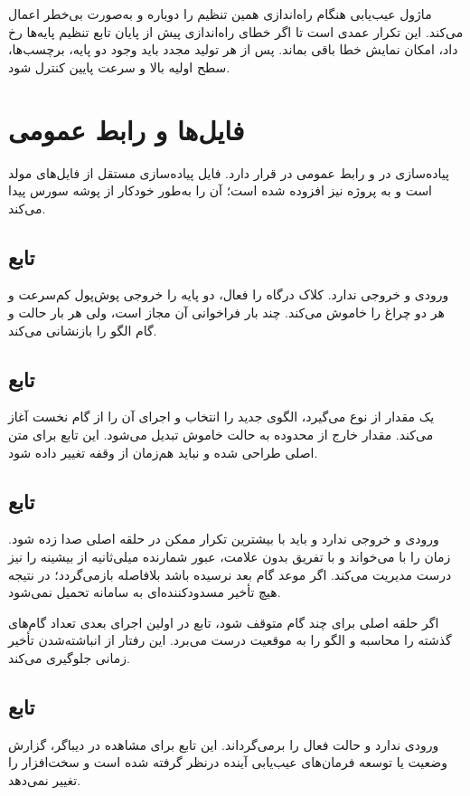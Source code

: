 ماژول عیب‌یابی هنگام راه‌اندازی همین تنظیم را دوباره و به‌صورت بی‌خطر اعمال می‌کند. این تکرار عمدی است تا اگر خطای راه‌اندازی پیش از پایان تابع تنظیم پایه‌ها رخ داد، امکان نمایش خطا باقی بماند. پس از هر تولید مجدد باید وجود دو پایه، برچسب‌ها، سطح اولیه بالا و سرعت پایین کنترل شود.

\section{فایل‌ها و رابط عمومی}
پیاده‌سازی در
و رابط عمومی در
قرار دارد. فایل پیاده‌سازی مستقل از فایل‌های مولد است و به پروژه
نیز افزوده شده است؛
آن را به‌طور خودکار از پوشه سورس پیدا می‌کند.

\subsection{تابع }
ورودی و خروجی ندارد. کلاک درگاه
را فعال، دو پایه را خروجی پوش‌پول کم‌سرعت و هر دو چراغ را خاموش می‌کند. چند بار فراخوانی آن مجاز است، ولی هر بار حالت و گام الگو را بازنشانی می‌کند.

\subsection{تابع }
یک مقدار از نوع
می‌گیرد، الگوی جدید را انتخاب و اجرای آن را از گام نخست آغاز می‌کند. مقدار خارج از محدوده به حالت خاموش تبدیل می‌شود. این تابع برای متن اصلی طراحی شده و نباید هم‌زمان از وقفه تغییر داده شود.

\subsection{تابع }
ورودی و خروجی ندارد و باید با بیشترین تکرار ممکن در حلقه اصلی صدا زده شود. زمان را با
می‌خواند و با تفریق بدون علامت، عبور شمارنده میلی‌ثانیه از بیشینه را نیز درست مدیریت می‌کند. اگر موعد گام بعد نرسیده باشد بلافاصله بازمی‌گردد؛ در نتیجه هیچ تأخیر مسدودکننده‌ای به سامانه تحمیل نمی‌شود.

اگر حلقه اصلی برای چند گام متوقف شود، تابع در اولین اجرای بعدی تعداد گام‌های گذشته را محاسبه و الگو را به موقعیت درست می‌برد. این رفتار از انباشته‌شدن تأخیر زمانی جلوگیری می‌کند.

\subsection{تابع }
ورودی ندارد و حالت فعال را برمی‌گرداند. این تابع برای مشاهده در دیباگر، گزارش وضعیت یا توسعه فرمان‌های عیب‌یابی آینده درنظر گرفته شده است و سخت‌افزار را تغییر نمی‌دهد.


